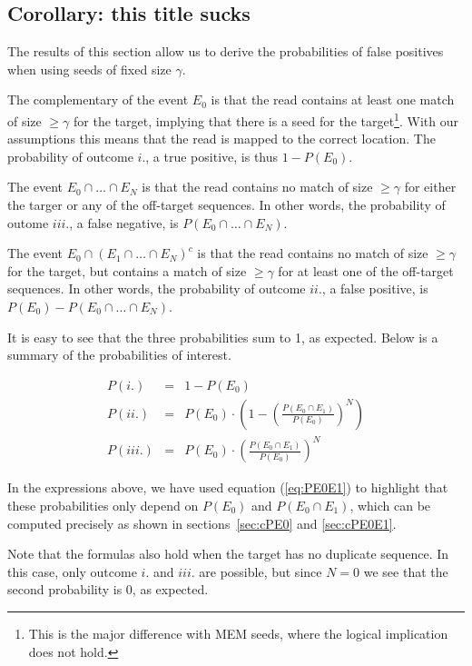 \documentclass{article}
\begin{document}
\subsection{Corollary: this title sucks}

The results of this section allow us to derive the probabilities of false
positives when using seeds of fixed size $\gamma$.

The complementary of the event $E_0$ is that the read contains at least
one match of size $\geq \gamma$ for the target, implying that there is a
seed for the target\footnote{This is the major difference with MEM seeds,
where the logical implication does not hold.}. With our assumptions this
means that the read is mapped to the correct location. The probability of
outcome $i.$, a true positive, is thus $1-P(E_0)$.

The event $E_0 \cap \ldots \cap E_N$ is that the read contains no match of
size $\geq \gamma$ for either the targer or any of the off-target
sequences. In other words, the probability of outome $iii.$, a false
negative, is $P(E_0 \cap \ldots \cap E_N)$.

The event $E_0 \cap (E_1 \cap \ldots \cap E_N)^c$ is that the read
contains no match of size $\geq \gamma$ for the target, but contains a
match of size $\geq \gamma$ for at least one of the off-target sequences.
In other words, the probability of outcome $ii.$, a false positive, is
$P(E_0) - P(E_0 \cap \ldots \cap E_N)$.

It is easy to see that the three probabilities sum to 1, as expected.
Below is a summary of the probabilities of interest.

\begin{eqnarray}
P(i.) &=& 1-P(E_0) \\
P(ii.) &=& P(E_0) \cdot \left( 1- \left( \frac{P(E_0
  \cap E_1)}{P(E_0)} \right)^N\right) \\
P(iii.) &=& P(E_0) \cdot \left( \frac{P(E_0 \cap E_1)}{P(E_0)} \right)^N
\end{eqnarray}

In the expressions above, we have used equation (\ref{eq:PE0E1}) to
highlight that these probabilities only depend on $P(E_0)$ and $P(E_0 \cap
E_1)$, which can be computed precisely as shown in sections~\ref{sec:cPE0}
and \ref{sec:cPE0E1}.

Note that the formulas also hold when the target has no duplicate
sequence. In this case, only outcome $i.$ and $iii.$ are possible, but
since $N=0$ we see that the second probability is 0, as expected.
\end{document}
